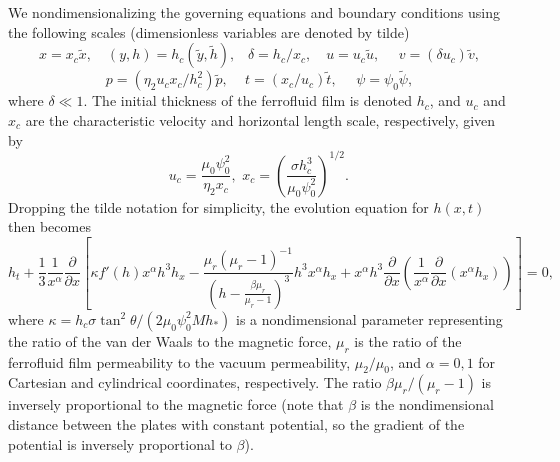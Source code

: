 We nondimensionalizing the governing equations and boundary conditions using the following scales (dimensionless variables are denoted by tilde)
$$
x=x_c \tilde{x}, \,\,\,\,\,\, \left( y, h \right) = h_c \left( \tilde{y},\tilde{h} \right), \,\,\,\,\, \delta = h_c/x_c, \,\,\,\,\,\, u = u_c \tilde{u}, \,\,\,\,\,\,\,\, v=\left( \delta u_c \right) \tilde{v},  \nonumber
$$
$$
p = \left( \eta_2 u_c x_c/h_c^2 \right) \tilde{p}, \,\,\,\,\,\,\, t = \left( x_c/u_c \right) \tilde{t},\,\,\,\,\,\,\,\, \psi = \psi_0 \tilde{\psi},
$$
where $\delta \ll 1$. The initial thickness of the ferrofluid film is denoted $h_c$, and  $u_c$ and $x_c$ are 
the characteristic velocity and horizontal length scale, respectively, given by 
$$
 u_c = \frac{\mu_0\psi_0^2}{\eta_2 x_c}, \,\, x_c = \left( \frac{\sigma h_c^3}{\mu_0\psi_0^2} \right) ^{1/2}. \, \nonumber
$$
Dropping the tilde notation for simplicity, the evolution equation for $h(x,t)$ then becomes
\begin{equation}
\label{eq:axisymetric}
h_t + \frac{1}{3} \frac{1}{x^\alpha} \frac{\partial}{\partial x} \left[ \kappa f'\left(h\right)  x^\alpha h^3 h_{x} - \frac{ \mu_r \left( \mu_r - 1 \right)^{-1}}{\left( h - \frac{\beta \mu_r}{ \mu_r - 1 }\right)^3 } h^3 x^\alpha h_x + x^\alpha h^3 \frac{\partial}{\partial x}\left( \frac{1}{x^\alpha} \frac{\partial}{\partial x} \left(x^\alpha h_x  \right) \right) \right] = 0, 
\end{equation}
where $\kappa={h_c \sigma  \tan^2 \theta }/{\left(2 \mu_0\psi_0^2 M {h}_*\right)}$ is a nondimensional parameter representing 
the ratio of the van der Waals to the magnetic force, 
$\mu_r$ is the ratio of the ferrofluid film permeability to the 
vacuum permeability, $\mu_2/\mu_0$, and  $\alpha=0, 1$ for Cartesian and cylindrical coordinates, respectively.
The ratio $\beta \mu_r/(\mu_r - 1)$ is inversely proportional to the magnetic force (note that $\beta$ is the 
nondimensional distance between the plates with constant potential, 
so the gradient of the potential is inversely proportional to $\beta$). 


